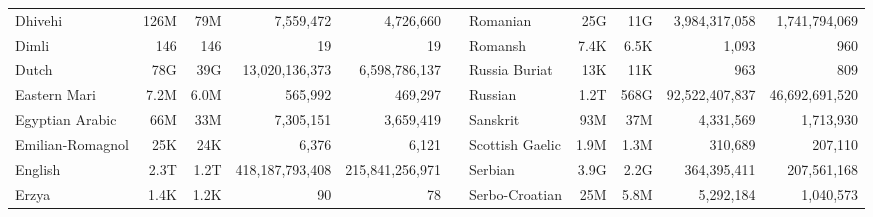 \begin{table*}[t!]
{\begin{tabular}{@{}lrrrrclrrrr@{}}
            Dhivehi                   & 126M                     & 79M                       & 7,559,472                & 4,726,660                 &                          & Romanian                  & 25G                      & 11G                       & 3,984,317,058            & 1,741,794,069             \\
            Dimli                     & 146                      & 146                       & 19                       & 19                        &                          & Romansh                   & 7.4K                     & 6.5K                      & 1,093                    & 960                       \\
            Dutch                     & 78G                      & 39G                       & 13,020,136,373           & 6,598,786,137             &                          & Russia Buriat             & 13K                      & 11K                       & 963                      & 809                       \\
            Eastern Mari              & 7.2M                     & 6.0M                      & 565,992                  & 469,297                   &                          & Russian                   & 1.2T                     & 568G                      & 92,522,407,837           & 46,692,691,520            \\
            Egyptian Arabic           & 66M                      & 33M                       & 7,305,151                & 3,659,419                 &                          & Sanskrit                  & 93M                      & 37M                       & 4,331,569                & 1,713,930                 \\
            Emilian-Romagnol          & 25K                      & 24K                       & 6,376                    & 6,121                     &                          & Scottish Gaelic           & 1.9M                     & 1.3M                      & 310,689                  & 207,110                   \\
            English                   & 2.3T                     & 1.2T                      & 418,187,793,408          & 215,841,256,971           &                          & Serbian                   & 3.9G                     & 2.2G                      & 364,395,411              & 207,561,168               \\
            Erzya                     & 1.4K                     & 1.2K                      & 90                       & 78                        &                          & Serbo-Croatian            & 25M                      & 5.8M                      & 5,292,184                & 1,040,573                 \\

\end{tabular}}
\end{table*}
